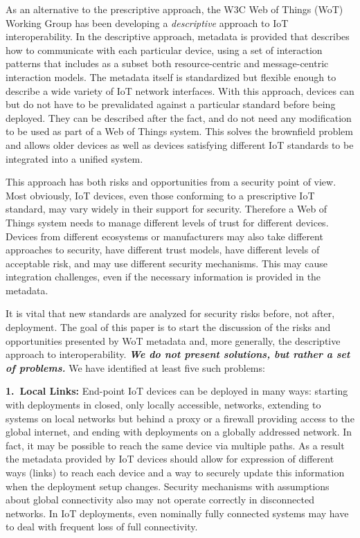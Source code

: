 As an alternative to the prescriptive approach,
the W3C Web of Things (WoT) Working Group has been developing a \emph{descriptive} 
approach to IoT interoperability.
In the descriptive approach,
metadata is provided that describes how to communicate with each particular device,
using a set of interaction patterns that includes as a subset both resource-centric
and message-centric interaction models.
The metadata itself is standardized but flexible enough to describe a wide variety of
IoT network interfaces.
With this approach,
devices can but do not have to be prevalidated against 
a particular standard before being deployed.
They can be described after the fact,
and do not need any modification to be
used as part of a Web of Things system.
This solves the brownfield problem and allows
older devices as well as devices satisfying different IoT 
standards to be integrated into a unified system.  

This approach has both risks and opportunities from a security point of view.
Most obviously, IoT devices, even those conforming to a prescriptive IoT standard,
may vary widely in their support for security.
Therefore a Web of Things system
needs to manage different levels of trust for different devices.
Devices from different ecosystems or manufacturers may also take different approaches to
security, have different trust models, have different levels of acceptable risk,
and may use different security mechanisms. 
This may cause integration challenges, even if the necessary
information is provided in the metadata.

It is vital that new standards are analyzed for security risks before,
not after, deployment.
The goal of this paper is to start the discussion of
the risks and opportunities presented
by WoT metadata and, 
more generally, the descriptive approach to interoperability.  
\textit{\textbf{We do not present solutions, but rather a set of problems.}}
We have identified at least five such problems:

\noindent\textbf{1.~Local Links:}
End-point IoT devices can be deployed in many ways: 
starting with deployments in closed, only locally accessible,
networks, extending to systems on local networks but behind a proxy or a firewall 
providing access to the global internet, and ending with deployments on a globally addressed network. 
In fact, it may be possible to reach the same device via multiple paths.
As a result the metadata provided by IoT devices should allow for expression of
different ways (links) to reach each device 
and a way to securely update this information when the deployment setup changes. 
Security mechanisms with assumptions about global connectivity also may not
operate correctly in disconnected networks.
In IoT deployments, even nominally fully connected systems may have to 
deal with frequent loss of full connectivity.

